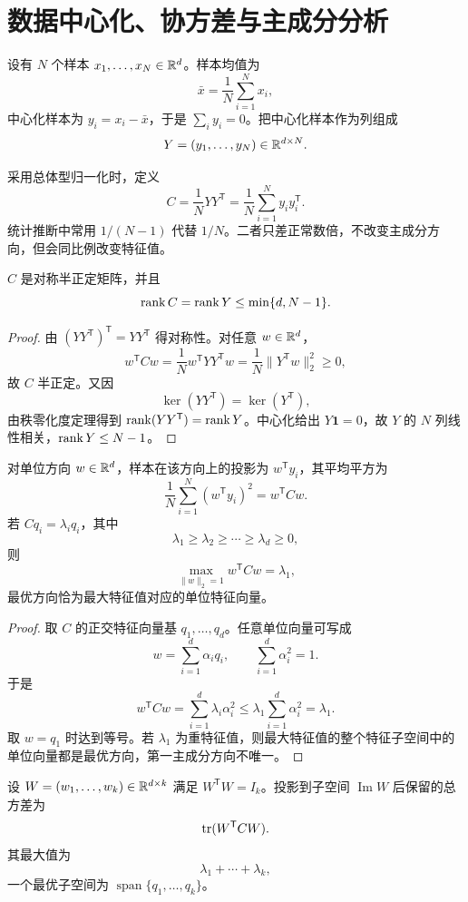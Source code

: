 \section{数据中心化、协方差与主成分分析}

设有 $N$ 个样本 $x_1,\ldots,x_N\in\mathbb{R}^d$。样本均值为
\[
\bar x=\frac1N\sum_{i=1}^Nx_i,
\]
中心化样本为 $y_i=x_i-\bar x$，于是 $\sum_i y_i=0$。把中心化样本作为列组成
\[
Y=(y_1,\ldots,y_N)\in\mathbb{R}^{d\times N}.
\]

\begin{definition}[样本协方差矩阵]
采用总体型归一化时，定义
\[
C=\frac1NYY^{\mathsf T}
=\frac1N\sum_{i=1}^Ny_iy_i^{\mathsf T}.
\]
统计推断中常用 $1/(N-1)$ 代替 $1/N$。二者只差正常数倍，不改变主成分方向，但会同比例改变特征值。
\end{definition}

\begin{proposition}[协方差矩阵的基本性质]
$C$ 是对称半正定矩阵，并且
\[
\operatorname{rank} C=\operatorname{rank} Y\le\min\{d,N-1\}.
\]
\end{proposition}
\begin{proof}
由 $(YY^{\mathsf T})^{\mathsf T}=YY^{\mathsf T}$ 得对称性。对任意 $w\in\mathbb{R}^d$，
\[
w^{\mathsf T}Cw=\frac1Nw^{\mathsf T}YY^{\mathsf T}w
=\frac1N\lVert Y^{\mathsf T}w\rVert_2^2\ge0,
\]
故 $C$ 半正定。又因
\[
\ker(YY^{\mathsf T})=\ker(Y^{\mathsf T}),
\]
由秩零化度定理得到 $\operatorname{rank}(YY^{\mathsf T})=\operatorname{rank} Y$。中心化给出 $Y\bm 1=0$，故 $Y$ 的 $N$ 列线性相关，$\operatorname{rank} Y\le N-1$。
\end{proof}

\begin{theorem}[第一主成分的方差最大化表述]
对单位方向 $w\in\mathbb{R}^d$，样本在该方向上的投影为 $w^{\mathsf T}y_i$，其平均平方为
\[
\frac1N\sum_{i=1}^N(w^{\mathsf T}y_i)^2=w^{\mathsf T}Cw.
\]
若 $Cq_i=\lambda_iq_i$，其中
\[
\lambda_1\ge\lambda_2\ge\cdots\ge\lambda_d\ge0,
\]
则
\[
\max_{\lVert w\rVert_2=1}w^{\mathsf T}Cw=\lambda_1,
\]
最优方向恰为最大特征值对应的单位特征向量。
\end{theorem}
\begin{proof}
取 $C$ 的正交特征向量基 $q_1,\ldots,q_d$。任意单位向量可写成
\[
w=\sum_{i=1}^d\alpha_iq_i,
\qquad
\sum_{i=1}^d\alpha_i^2=1.
\]
于是
\[
w^{\mathsf T}Cw
=\sum_{i=1}^d\lambda_i\alpha_i^2
\le\lambda_1\sum_{i=1}^d\alpha_i^2
=\lambda_1.
\]
取 $w=q_1$ 时达到等号。若 $\lambda_1$ 为重特征值，则最大特征值的整个特征子空间中的单位向量都是最优方向，第一主成分方向不唯一。
\end{proof}

\begin{theorem}[前 $k$ 个主成分]
设 $W=(w_1,\ldots,w_k)\in\mathbb{R}^{d\times k}$ 满足 $W^{\mathsf T}W=I_k$。投影到子空间 $\operatorname{Im}W$ 后保留的总方差为
\[
\operatorname{tr}(W^{\mathsf T}CW).
\]
其最大值为
\[
\lambda_1+\cdots+\lambda_k,
\]
一个最优子空间为 $\operatorname{span}\{q_1,\ldots,q_k\}$。
\end{theorem}

